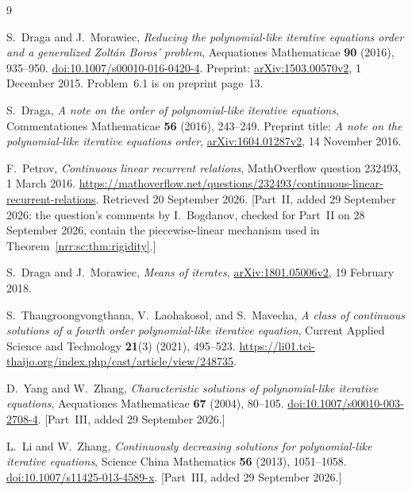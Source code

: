 \documentclass[11pt,letterpaper]{article}
\theoremstyle{definition}
\theoremstyle{remark}
\begin{document}
\clearpage
\begin{thebibliography}{9}

S.~Draga and J.~Morawiec,
\emph{Reducing the polynomial-like iterative equations order and a
generalized Zolt\'an Boros' problem},
Aequationes Mathematicae \textbf{90} (2016), 935--950.
\href{https://doi.org/10.1007/s00010-016-0420-4}{doi:10.1007/s00010-016-0420-4}.
Preprint: \href{https://arxiv.org/abs/1503.00570v2}{arXiv:1503.00570v2},
1 December 2015. Problem~6.1 is on preprint page~13.

S.~Draga,
\emph{A note on the order of polynomial-like iterative equations},
Commentationes Mathematicae \textbf{56} (2016), 243--249.
Preprint title: \emph{A note on the polynomial-like iterative equations
order}, \href{https://arxiv.org/abs/1604.01287v2}{arXiv:1604.01287v2},
14 November 2016.

F.~Petrov,
\emph{Continuous linear recurrent relations},
MathOverflow question 232493, 1 March 2016.
\url{https://mathoverflow.net/questions/232493/continuous-linear-recurrent-relations}.
Retrieved 20 September 2026.
[Part~II, added 29 September 2026: the question's comments by I.~Bogdanov,
checked for Part~II on 28 September 2026, contain the piecewise-linear
mechanism used in Theorem~\ref{nrr:sc:thm:rigidity}.]

S.~Draga and J.~Morawiec,
\emph{Means of iterates},
\href{https://arxiv.org/abs/1801.05006v2}{arXiv:1801.05006v2},
19 February 2018.

S.~Thangroongvongthana, V.~Laohakosol, and S.~Mavecha,
\emph{A class of continuous solutions of a fourth order polynomial-like
iterative equation},
Current Applied Science and Technology \textbf{21}(3) (2021), 495--523.
\url{https://li01.tci-thaijo.org/index.php/cast/article/view/248735}.

D.~Yang and W.~Zhang,
\emph{Characteristic solutions of polynomial-like iterative equations},
Aequationes Mathematicae \textbf{67} (2004), 80--105.
\href{https://doi.org/10.1007/s00010-003-2708-4}{doi:10.1007/s00010-003-2708-4}.
[Part~III, added 29 September 2026.]

L.~Li and W.~Zhang,
\emph{Continuously decreasing solutions for polynomial-like iterative
equations}, Science China Mathematics \textbf{56} (2013), 1051--1058.
\href{https://doi.org/10.1007/s11425-013-4589-x}{doi:10.1007/s11425-013-4589-x}.
[Part~III, added 29 September 2026.]


\end{thebibliography}
\end{document}
